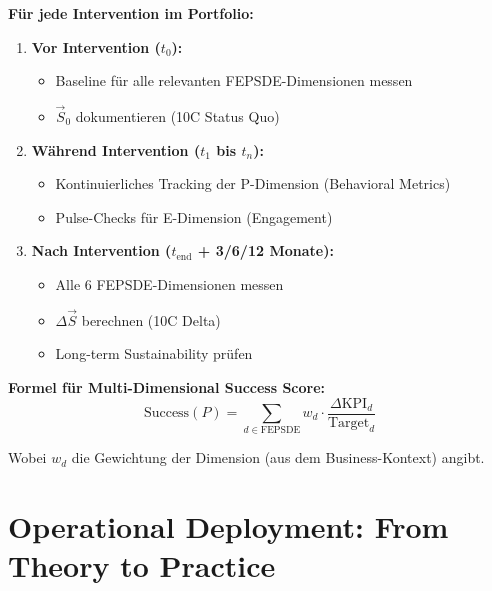 \begin{tcolorbox}[colback=yellow!5!white, colframe=yellow!75!black,
    title=\textbf{Das 3×3 KPI-Protokoll}]

\textbf{Für jede Intervention im Portfolio:}

\begin{enumerate}
\item \textbf{Vor Intervention ($t_0$):}
   \begin{itemize}[nosep]
   \item Baseline für alle relevanten FEPSDE-Dimensionen messen
   \item $\vec{S}_0$ dokumentieren (10C Status Quo)
   \end{itemize}

\item \textbf{Während Intervention ($t_1$ bis $t_n$):}
   \begin{itemize}[nosep]
   \item Kontinuierliches Tracking der P-Dimension (Behavioral Metrics)
   \item Pulse-Checks für E-Dimension (Engagement)
   \end{itemize}

\item \textbf{Nach Intervention ($t_{\text{end}}$ + 3/6/12 Monate):}
   \begin{itemize}[nosep]
   \item Alle 6 FEPSDE-Dimensionen messen
   \item $\Delta\vec{S}$ berechnen (10C Delta)
   \item Long-term Sustainability prüfen
   \end{itemize}
\end{enumerate}

\textbf{Formel für Multi-Dimensional Success Score:}
\begin{equation}
\text{Success}(P) = \sum_{d \in \text{FEPSDE}} w_d \cdot \frac{\Delta \text{KPI}_d}{\text{Target}_d}
\end{equation}

Wobei $w_d$ die Gewichtung der Dimension (aus dem Business-Kontext) angibt.
\end{tcolorbox}


\section{Operational Deployment: From Theory to Practice}
\label{sec:20-deployment}

